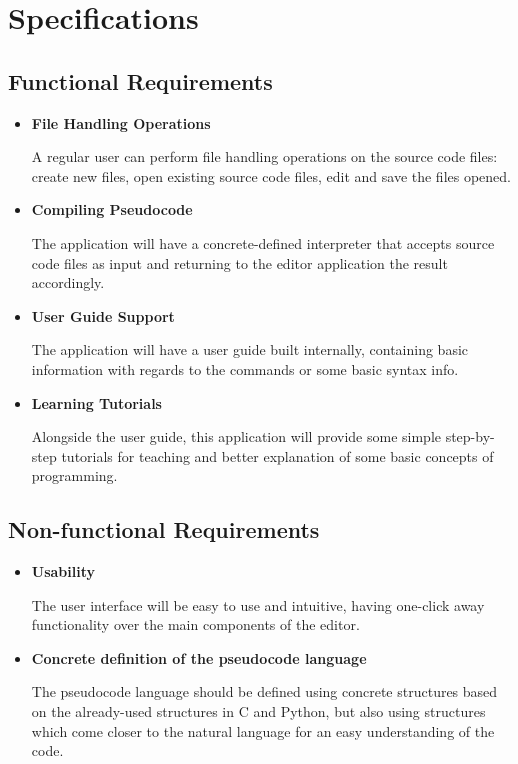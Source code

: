 \documentclass[12pt,a4paper,twoside]{report}
\begin{document}
\section{Specifications}
\subsection{Functional Requirements}
\begin{itemize}
\item \textbf{File Handling Operations}
	
	A regular user can perform file handling operations on the source code files: create new files, open existing source code files, edit and save the files opened.
	
\item \textbf{Compiling Pseudocode}

	The application will have a concrete-defined interpreter that accepts source code files as input and returning to the editor application the result accordingly.
	
\item \textbf{User Guide Support}
	
	The application will have a user guide built internally, containing basic information with regards to the commands or some basic syntax info.

\item \textbf{Learning Tutorials}

	Alongside the user guide, this application will provide some simple step-by-step tutorials for teaching and better explanation of some basic concepts of programming.
	
\end{itemize}
\subsection{Non-functional Requirements}
\begin{itemize}
\item \textbf{Usability}

The user interface will be easy to use and intuitive, having one-click away functionality over the main components of the editor.

\item \textbf{Concrete definition of the pseudocode language}

The pseudocode language should be defined using concrete structures based on the already-used structures in C and Python, but also using structures which come closer to the natural language for an easy understanding of the code.
\end{itemize}
\end{document}
